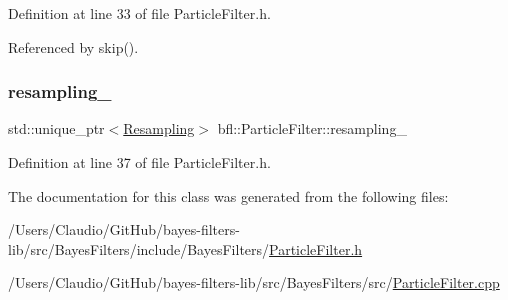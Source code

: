Definition at line 33 of file Particle\+Filter.\+h.



Referenced by skip().

\mbox{\label{classbfl_1_1ParticleFilter_a9b0b855942fa4fb847443b10fe26c589}} 
\subsubsection{\texorpdfstring{resampling\+\_\+}{resampling\_}}
{\footnotesize\ttfamily std\+::unique\+\_\+ptr$<$\mbox{\hyperlink{classbfl_1_1Resampling}{Resampling}}$>$ bfl\+::\+Particle\+Filter\+::resampling\+\_\+\hspace{0.3cm}{\ttfamily [protected]}}



Definition at line 37 of file Particle\+Filter.\+h.



The documentation for this class was generated from the following files\+:\begin{DoxyCompactItemize}
\item 
/\+Users/\+Claudio/\+Git\+Hub/bayes-\/filters-\/lib/src/\+Bayes\+Filters/include/\+Bayes\+Filters/\mbox{\hyperlink{ParticleFilter_8h}{Particle\+Filter.\+h}}\item 
/\+Users/\+Claudio/\+Git\+Hub/bayes-\/filters-\/lib/src/\+Bayes\+Filters/src/\mbox{\hyperlink{ParticleFilter_8cpp}{Particle\+Filter.\+cpp}}\end{DoxyCompactItemize}
